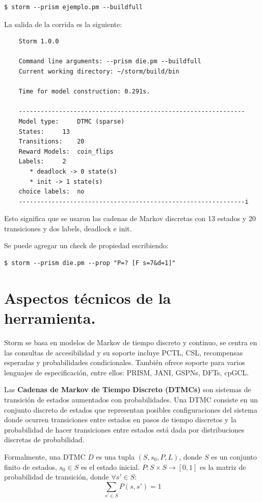 \documentclass[11pt]{article}
\begin{document}
\begin{verbatim}
$ storm --prism ejemplo.pm --buildfull
\end{verbatim}
					
La salida de la corrida es la siguiente:

\begin{verbatim}
	Storm 1.0.0

	Command line arguments: --prism die.pm --buildfull
	Current working directory: ~/storm/build/bin
	
	Time for model construction: 0.291s.
	
	--------------------------------------------------------------
	Model type: 	DTMC (sparse)
	States: 	13
	Transitions: 	20
	Reward Models:  coin_flips
	Labels: 	2
	   * deadlock -> 0 state(s)
	   * init -> 1 state(s)
	choice labels: 	no
	--------------------------------------------------------------i
\end{verbatim}

Esto significa que se usaron las cadenas de Markov discretas con 13 estados y 20 transiciones y dos labels, deadlock e init.

Se puede agregar un check de propiedad escribiendo:

\begin{verbatim}
$ storm --prism die.pm --prop "P=? [F s=7&d=1]"
\end{verbatim}


\section{Aspectos t\'ecnicos de la herramienta.}

Storm se basa en modelos de Markov de tiempo discreto y continuo, se centra en las consultas de accesibilidad y su soporte incluye PCTL, CSL, recompensas esperadas y probabilidades condicionales. Tambi\'en ofrece soporte para varios lenguajes de especificaci\'on, entre ellos: PRISM, JANI, GSPNs, DFTs, cpGCL.

Las \textbf{Cadenas de Markov de Tiempo Discreto (DTMCs)} son sistemas de transici\'on de estados aumentados con probabilidades. Una DTMC consiste en un conjunto discreto de estados que representan posibles configuraciones del sistema donde ocurren transiciones entre estados en pasos de tiempo discretos y la probabilidad de hacer transiciones entre estados est\'a dada por distribuciones discretas de probabilidad.
 
Formalmente, una DTMC $D$ es una tupla $(S, s_0, P, L)$, donde $S$ es un conjunto finito de estados, $s_0 \in S$ es el estado inicial. $P: S \times S \rightarrow [0,1]$ es la matriz de probabilidad de transici\'on, donde $\forall  s' \in S$:
\[
\sum_{s' \in S} P(s,s') = 1
\]
\end{document}
